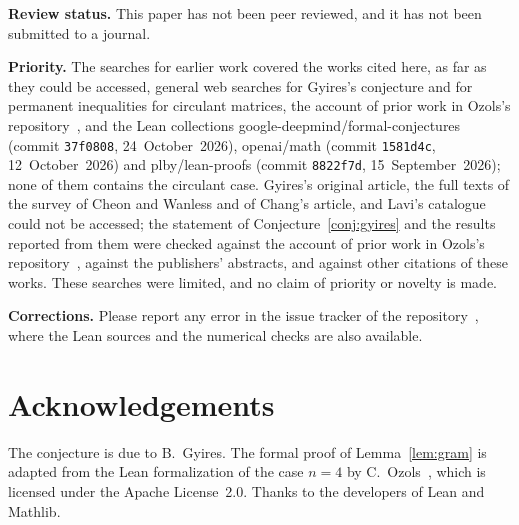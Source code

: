 \documentclass[11pt,a4paper]{article}
\theoremstyle{definition}
\theoremstyle{remark}
\newcommand{\para}[1]{\par\medskip\noindent\textbf{#1}\enspace}
\begin{document}
\para{Review status.} This paper has not been peer reviewed, and it has not been submitted to a journal.

\para{Priority.} The searches for earlier work covered the works cited here, as far as they could be accessed,
general web searches for Gyires's conjecture and for permanent inequalities for circulant matrices, the account of prior
work in Ozols's repository~\cite{ozols}, and the Lean collections google-deepmind/formal-conjectures (commit
\texttt{37f0808}, 24~October~2026), openai/math (commit \texttt{1581d4c}, 12~October~2026) and plby/lean-proofs (commit
\texttt{8822f7d}, 15~September~2026); none of them contains the circulant case. Gyires's original article, the full texts of
the survey of Cheon and Wanless and of Chang's article, and Lavi's catalogue could not be accessed; the statement of
Conjecture~\ref{conj:gyires} and the results reported from them were checked against the account of prior work in
Ozols's repository~\cite{ozols}, against the publishers' abstracts, and against other citations of these works. These
searches were limited, and no claim of priority or novelty is made.

\para{Corrections.} Please report any error in the issue tracker of the repository~\cite{repo}, where the Lean sources and
the numerical checks are also available.

\section*{Acknowledgements}
The conjecture is due to B.~Gyires. The formal proof of Lemma~\ref{lem:gram} is adapted from the Lean formalization of
the case $n=4$ by C.~Ozols~\cite{ozols}, which is licensed under the Apache License~2.0. Thanks to the developers of
Lean and Mathlib.
\end{document}
